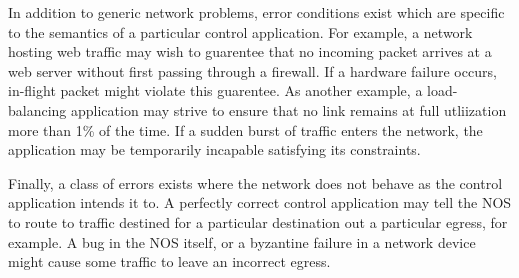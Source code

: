 
In addition to generic network problems, error conditions exist which are
specific to the semantics of a particular control application. For example, a network
hosting web traffic may wish to guarentee that no incoming packet arrives
at a web server without first passing through a firewall. If a hardware
failure occurs, in-flight packet might violate this guarentee. As another
example, a load-balancing application may strive to ensure that no link
remains at full utliization more than 1\% of the time. If a sudden burst of
traffic enters the network, the application may be temporarily incapable
satisfying its constraints. 

Finally, a class of errors exists where the network does not behave as the
control application intends it to. A perfectly correct control application may
tell the NOS to route to traffic destined for a particular destination
out a particular egress, for example. A bug in the NOS itself, or a byzantine
failure in a network device might cause some traffic to leave an incorrect
egress.

